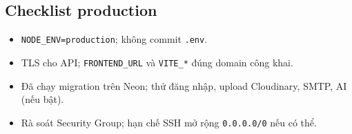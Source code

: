\subsection{Checklist production}

\begin{itemize}
    \item \texttt{NODE\_ENV=production}; không commit \texttt{.env}.
    \item TLS cho API; \texttt{FRONTEND\_URL} và \texttt{VITE\_*} đúng domain công khai.
    \item Đã chạy migration trên Neon; thử đăng nhập, upload Cloudinary, SMTP, AI (nếu bật).
    \item Rà soát Security Group; hạn chế SSH mở rộng \texttt{0.0.0.0/0} nếu có thể.
\end{itemize}
